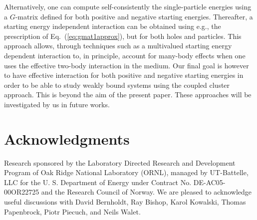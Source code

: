 Alternatively, one can compute
self-consistently the single-particle energies using a $G$-matrix 
defined for both positive and negative starting energies. 
Thereafter, a starting energy independent
interaction can be obtained using e.g., the prescription of 
Eq.~(\ref{eq:gmat1approx}), but for both holes
and particles. This approach allows, 
through techniques such as a multivalued starting energy
dependent interaction to, in principle, account for many-body 
effects when one uses the effective two-body interaction in the
medium.
Our final goal is however to have effective interaction for both positive and 
negative starting energies in order to be able to study weakly bound
systems using the coupled cluster approach. This is beyond the 
aim of the present paper. These approaches will be investigated by us
in future works.  

\section*{Acknowledgments}
Research sponsored by the Laboratory Directed Research and Development
Program of Oak Ridge National Laboratory (ORNL), managed by
UT-Battelle, LLC for the U. S.  Department of Energy under
Contract No. DE-AC05-00OR22725 and the Research Council of Norway. 
We are pleased to acknowledge useful discussions with David Bernholdt,
Ray Bishop, Karol Kowalski, Thomas Papenbrock, Piotr Piecuch, 
and Neils Walet.

